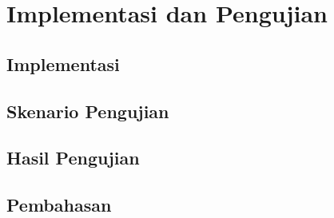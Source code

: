 \chapter{Implementasi dan Pengujian}

\section{Implementasi}

\section{Skenario Pengujian}

\section{Hasil Pengujian}

\section{Pembahasan}